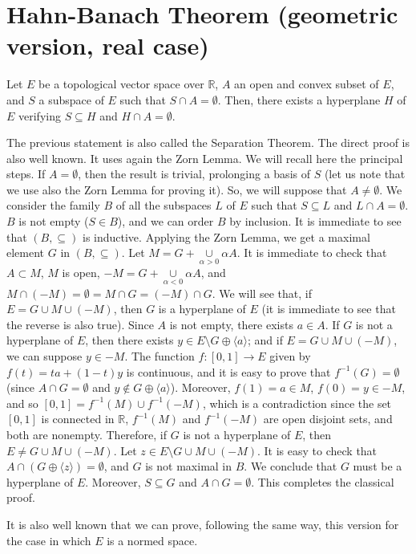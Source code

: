 \documentclass{article}
\begin{document}
\section{Hahn-Banach Theorem (geometric version, re\-al case)}

Let $E$ be a topological vector space over $\mathbb{R}$, $A$ an open and convex subset of $E$, and $S$ a subspace of $E$ such that $S\cap A=\emptyset$. Then, there exists a hyperplane $H$ of $E$ verifying $S\subseteq H$ and $H\cap A=\emptyset$.

The previous statement is also called the Separation Theorem. The direct proof is also well known. It uses again the Zorn Lemma. We will recall here the principal steps. If $A=\emptyset$, then the result is trivial, prolonging a basis of $S$ (let us note that we use also the Zorn Lemma for proving it). So, we will suppose that $A\neq\emptyset$. We consider the family $B$ of all the subspaces $L$ of $E$ such that $S\subseteq L$ and $L\cap A=\emptyset$. $B$ is not empty ($S\in B$), and we can order $B$ by inclusion. It is immediate to see that $(B,\subseteq)$ is inductive. Applying the Zorn Lemma, we get a maximal element $G$ in $(B,\subseteq)$. Let $M=G+\underset{\alpha>0}{\cup}\alpha A$. It is immediate to check that $A\subset M$, $M$ is open, $-M=G+\underset{\alpha<0}{\cup}\alpha A$, and $M\cap(-M)=\emptyset=M\cap G=(-M)\cap G$. We will see that, if $E=G\cup M\cup(-M)$, then $G$ is a hyperplane of $E$ (it is immediate to see that the reverse is also true). Since $A$ is not empty, there exists $a\in A$. If $G$ is not a hyperplane of $E$, then there exists $y\in E\setminus G\oplus\langle a\rangle $; and if $E=G\cup M\cup(-M)$, we can suppose $y\in-M$. The function $f:[0,1]\rightarrow E$ given by $f(t)=ta+(1-t)y$ is continuous, and it is easy to prove that $f^{-1}(G)=\emptyset$  (since $A\cap G=\emptyset$ and $y\notin G\oplus\langle a\rangle $). Moreover, $f(1)=a\in M$, $f(0)=y\in-M$, and so $[0,1]=f^{-1}(M)\cup f^{-1}(-M)$, which is a contradiction since the set $[0,1]$ is connected in $\mathbb{R}$, $f^{-1}(M)$ and $f^{-1}(-M)$ are open disjoint sets, and both are nonempty. Therefore, if $G$ is not a hyperplane of $E$, then $E\neq G\cup M\cup(-M)$. Let $z\in E\setminus G\cup M\cup(-M)$. It is easy to check that $A\cap(G\oplus\langle z\rangle)=\emptyset$, and $G$ is not maximal in $B$. We conclude that $G$ must be a hyperplane of $E$. Moreover, $S\subseteq G$ and $A\cap G=\emptyset$. This completes the classical proof.

It is also well known that we can prove, following the same way, this version for the case in which $E$ is a normed space.
\end{document}
